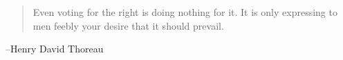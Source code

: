\documentclass{exam}
\begin{document}
  \else
    \vspace{11 cm}
    \begin{quote}
      \begin{em}
        Even voting for the right is doing nothing for it. It is only expressing to men
        feebly your desire that it should prevail. 
      \end{em}
    \end{quote}
    \hspace{1 cm} --Henry David Thoreau
  \fi
\end{document}
